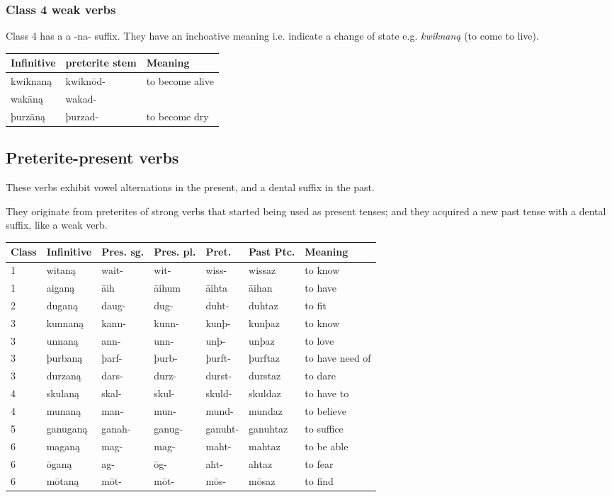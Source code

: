 \documentclass{article}
\begin{document}
\subsubsection{Class 4 weak verbs}

Class 4 has a a -na- suffix. They have an inchoative meaning i.e. indicate a change of state e.g. \emph{kwiknaną} (to come to live).

\begin{center}
\begin{tabular}{| l l l |}
\hline
Infinitive & preterite stem & Meaning \\
\hline
kwiknaną & kwiknōd- & to become alive \\
wakāną  & wakad-  &  \\
þurzāną & þurzad- & to become dry \\
\hline
\end{tabular}
\end{center}

\subsection{Preterite-present verbs}

These verbs exhibit vowel alternations in the present, and a dental suffix in the past.

They originate from preterites of strong verbs that started being used as present tenses; and they acquired a new past tense with a dental suffix, like a weak verb.

\begin{center}
\begin{tabular}{|l l l l l l l|}
\hline
Class & Infinitive & Pres. sg. & Pres. pl. & Pret. & Past Ptc. & Meaning \\
\hline
1 & witaną & wait- & wit- & wiss- & wissaz & to know \\
1 & aiganą & āih & āihum & āihta & āihan & to have \\
2 & duganą & daug- & dug- & duht- & duhtaz & to fit \\
3 & kunnaną & kann- & kunn- & kunþ- & kunþaz & to know \\
3 & unnaną & ann- & unn- & unþ- & unþaz & to love \\
3 & þurbaną & þarf- & þurb- & þurft- & þurftaz & to have need of \\
3 & durzaną & dars- & durz- & durst- & durstaz & to dare \\
4 & skulaną & skal- & skul- & skuld- & skuldaz & to have to \\
4 & munaną & man- & mun- & mund- & mundaz & to believe \\
5 & ganuganą & ganah- & ganug- & ganuht- & ganuhtaz & to suffice \\
6 & maganą & mag- & mag- & maht- & mahtaz & to be able \\
6 & ōganą & ag- & ōg- & aht- & ahtaz & to fear \\
6 & mōtaną & mōt- & mōt- & mōs- & mōsaz & to find \\
\hline
\end{tabular}
\end{center}
\end{document}
